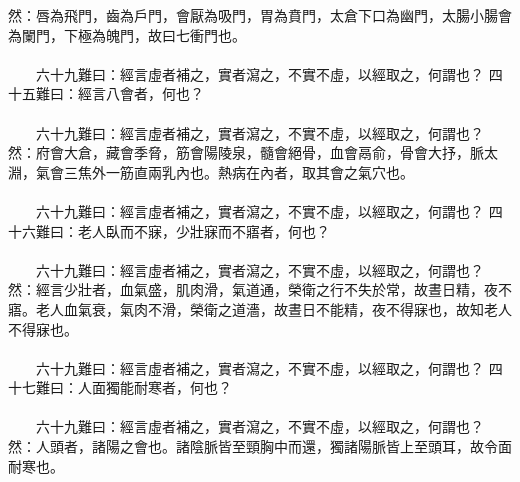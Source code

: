 然：唇為飛門，齒為戶門，會厭為吸門，胃為賁門，太倉下口為幽門，太腸小腸會為闌門，下極為魄門，故曰七衝門也。
\\\\
　　六十九難曰：經言虛者補之，實者瀉之，不實不虛，以經取之，何謂也？
四十五難曰：經言八會者，何也？
\\\\
　　六十九難曰：經言虛者補之，實者瀉之，不實不虛，以經取之，何謂也？
然：府會大倉，藏會季脅，筋會陽陵泉，髓會絕骨，血會鬲俞，骨會大抒，脈太淵，氣會三焦外一筋直兩乳內也。熱病在內者，取其會之氣穴也。
\\\\
　　六十九難曰：經言虛者補之，實者瀉之，不實不虛，以經取之，何謂也？
四十六難曰：老人臥而不寐，少壯寐而不寤者，何也？
\\\\
　　六十九難曰：經言虛者補之，實者瀉之，不實不虛，以經取之，何謂也？
然：經言少壯者，血氣盛，肌肉滑，氣道通，榮衛之行不失於常，故晝日精，夜不寤。老人血氣衰，氣肉不滑，榮衛之道濇，故晝日不能精，夜不得寐也，故知老人不得寐也。
\\\\
　　六十九難曰：經言虛者補之，實者瀉之，不實不虛，以經取之，何謂也？
四十七難曰：人面獨能耐寒者，何也？
\\\\
　　六十九難曰：經言虛者補之，實者瀉之，不實不虛，以經取之，何謂也？
然：人頭者，諸陽之會也。諸陰脈皆至頸胸中而還，獨諸陽脈皆上至頭耳，故令面耐寒也。